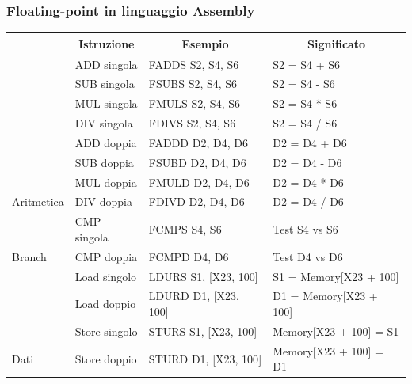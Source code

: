 \documentclass[12pt,a4paper]{article}
\begin{document}
\subsubsection{Floating-point in linguaggio Assembly}
\Sep
\begin{center}
\begin{tabular}{|l|l|l|l|}
\hline
\rowcolor[HTML]{FFCB2F} 
\multicolumn{1}{|c|}{Categoria}                             & \multicolumn{1}{c|}{Istruzione}         & \multicolumn{1}{c|}{Esempio}                  & \multicolumn{1}{c|}{Significato}                \\ \hline
                                      & ADD singola       & FADDS S2, S4, S6         & S2 = S4 + S6               \\ \cline{2-4} 
                                      & SUB singola     & FSUBS S2, S4, S6         & S2 = S4 - S6               \\ \cline{2-4} 
                                      & MUL singola & FMULS S2, S4, S6         & S2 = S4 * S6               \\ \cline{2-4} 
                                      & DIV singola       & FDIVS S2, S4, S6         & S2 = S4 / S6               \\ \cline{2-4} 
                                      & ADD doppia        & FADDD D2, D4, D6         & D2 = D4 + D6               \\ \cline{2-4} 
                                      & SUB doppia      & FSUBD D2, D4, D6         & D2 = D4 - D6               \\ \cline{2-4} 
                                      & MUL doppia  & FMULD D2, D4, D6         & D2 = D4 * D6               \\ \cline{2-4} 
\multirow{-8}{*}{Aritmetica}          & DIV doppia        & FDIVD D2, D4, D6         & D2 = D4 / D6               \\ \hline
                                      & CMP singola    & FCMPS S4, S6             & Test S4 vs S6              \\ \cline{2-4} 
\multirow{-2}{*}{Branch} & CMP doppia     & FCMPD D4, D6             & Test D4 vs D6              \\ \hline
                                      & Load singolo               & LDURS S1, {[}X23, 100{]} & S1 = Memory{[}X23 + 100{]} \\ \cline{2-4} 
                                      & Load doppio                & LDURD D1, {[}X23, 100{]} & D1 = Memory{[}X23 + 100{]} \\ \cline{2-4} 
                                      & Store singolo              & STURS S1, {[}X23, 100{]} & Memory{[}X23 + 100{]} = S1 \\ \cline{2-4} 
\multirow{-4}{*}{Dati}  & Store doppio               & STURD D1, {[}X23, 100{]} & Memory{[}X23 + 100{]} = D1 \\ \hline
\end{tabular}\end{center}
\end{document}
